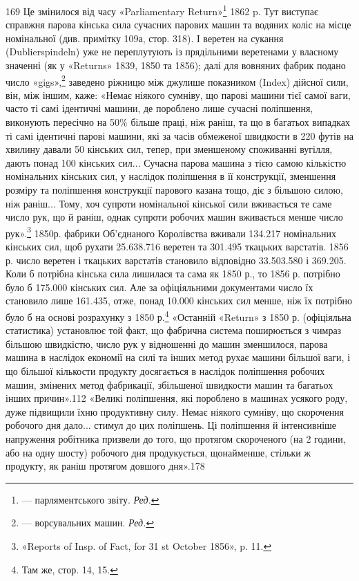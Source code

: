 169 Це змінилося від часу «Parliamentary Return»\footnote*{
— парляментського звіту. \emph{Ред.}
} 1862 p. Тут
виступає справжня парова кінська сила сучасних парових машин та водяних
коліс на місце номінальної (див. примітку 109а, стор. 318). І веретен
на сукання (Dublierspindeln) уже не переплутують із прядільними веретенами
у власному значенні (як у «Returns» 1839, 1850 та 1856); далі
для вовняних фабрик подано число «gigs»,\footnote*{
— ворсувальних машин. \emph{Ред.}
} заведено ріжницю між джулише
показником (Index) дійсної сили, він, між іншим, каже:
«Немає ніякого сумніву, що парові машини тієї самої ваги, часто
ті самі ідентичні машини, де пороблено лише сучасні поліпшення,
виконують пересічно на 50\% більше праці, ніж раніш, та що в
багатьох випадках ті самі ідентичні парові машини, які за часів
обмеженої швидкости в 220 футів на хвилину давали 50 кінських
сил, тепер, при зменшеному споживанні вугілля, дають понад 100
кінських сил... Сучасна парова машина з тією самою кількістю
номінальних кінських сил, у наслідок поліпшення в її конструкції,
зменшення розміру та поліпшення конструкції парового
казана тощо, діє з більшою силою, ніж раніш... Тому, хоч супроти
номінальної кінської сили вживається те саме число рук, що й
раніш, однак супроти робочих машин вживається менше число
рук».\footnote{
«Reports of Insp. of Fact, for 31 st October 1856», p. 11.
} 1850р. фабрики Об’єднаного Королівства вживали 134.217
номінальних кінських сил, щоб рухати 25.638.716 веретен та
301.495 ткацьких варстатів. 1856 р. число веретен і ткацьких
варстатів становило відповідно 33.503.580 і 369.205. Коли б
потрібна кінська сила лишилася та сама як 1850 р., то 1856 р.
потрібно було б 175.000 кінських сил. Але за офіціяльними документами
число їх становило лише 161.435, отже, понад 10.000
кінських сил менше, ніж їх потрібно було б на основі розрахунку
з 1850 р.\footnote{
Там же, стор. 14, 15.
} «Останній «Return» з 1850 р. (офіціяльна статистика)
установлює той факт, що фабрична система поширюється з чимраз
більшою швидкістю, число рук у відношенні до машин зменшилося,
парова машина в наслідок економії на силі та інших
метод рухає машини більшої ваги, і що більшої кількости продукту
досягається в наслідок поліпшення робочих машин, змінених
метод фабрикації, збільшеної швидкости машин та багатьох інших
причин».112 «Великі поліпшення, які пороблено в машинах
усякого роду, дуже підвищили їхню продуктивну силу. Немає
ніякого сумніву, що скорочення робочого дня дало... стимул
до цих поліпшень. Ці поліпшення й інтенсивніше напруження
робітника призвели до того, що протягом скороченого (на 2 години,
або на одну шосту) робочого дня продукується, щонайменше,
стільки ж продукту, як раніш протягом довшого дня».178

